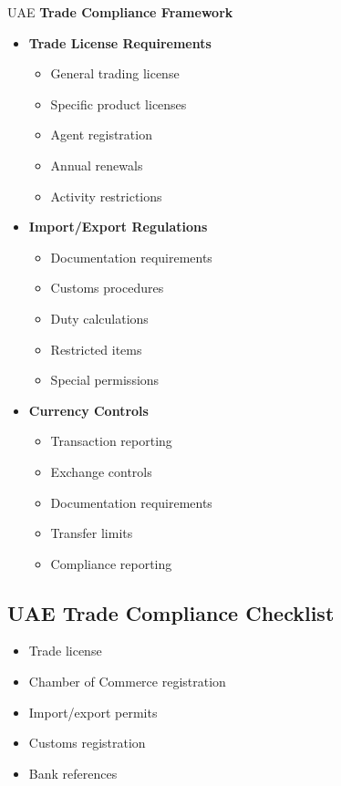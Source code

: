 \begin{regionalbox}{UAE}
\textbf{Trade Compliance Framework}
\begin{itemize}
    \item \textbf{Trade License Requirements}
    \begin{itemize}
        \item General trading license
        \item Specific product licenses
        \item Agent registration
        \item Annual renewals
        \item Activity restrictions
    \end{itemize}

    \item \textbf{Import/Export Regulations}
    \begin{itemize}
        \item Documentation requirements
        \item Customs procedures
        \item Duty calculations
        \item Restricted items
        \item Special permissions
    \end{itemize}

    \item \textbf{Currency Controls}
    \begin{itemize}
        \item Transaction reporting
        \item Exchange controls
        \item Documentation requirements
        \item Transfer limits
        \item Compliance reporting
    \end{itemize}
\end{itemize}

\subsection{UAE Trade Compliance Checklist}\label{subsec:uae-trade-compliance-checklist}
\begin{tcolorbox}[colback=white,colframe=primary,title=\textbf{Required Documents}]
\begin{itemize}
    \item Trade license
    \item Chamber of Commerce registration
    \item Import/export permits
    \item Customs registration
    \item Bank references
\end{itemize}
\end{tcolorbox}
\end{regionalbox}

